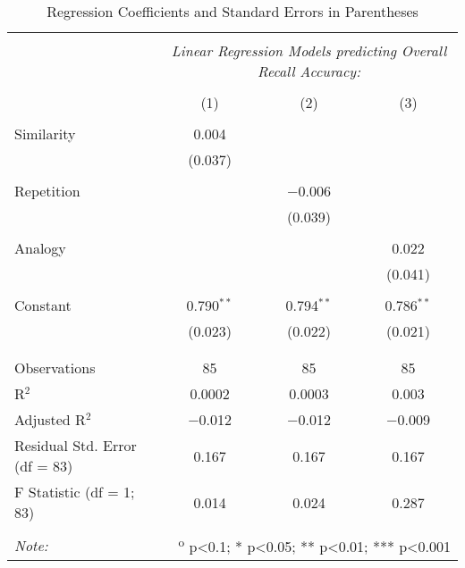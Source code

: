 
\begin{table}[!htbp] \centering
  \caption{Regression Coefficients and Standard Errors in Parentheses}
  \label{table:fol}
  \small
  \renewcommand{\arraystretch}{0.6}
\begin{tabular}{@{\extracolsep{5pt}}lccc}
\\[-1.8ex]\hline
\hline \\[-1.8ex]
 & \multicolumn{3}{c}{\textit{Linear Regression Models predicting Overall Recall Accuracy:}} \\
\cline{2-4}
\\[-1.8ex] & (1) & (2) & (3)\\
\hline \\[-1.8ex]
 Similarity & 0.004 &  &  \\
  & (0.037) &  &  \\
  & & & \\
 Repetition &  & $-$0.006 &  \\
  &  & (0.039) &  \\
  & & & \\
 Analogy &  &  & 0.022 \\
  &  &  & (0.041) \\
  & & & \\
 Constant & 0.790$^{**}$ & 0.794$^{**}$ & 0.786$^{**}$ \\
  & (0.023) & (0.022) & (0.021) \\
  & & & \\
\hline \\[-1.8ex]
Observations & 85 & 85 & 85 \\
R$^{2}$ & 0.0002 & 0.0003 & 0.003 \\
Adjusted R$^{2}$ & $-$0.012 & $-$0.012 & $-$0.009 \\
Residual Std. Error (df = 83) & 0.167 & 0.167 & 0.167 \\
F Statistic (df = 1; 83) & 0.014 & 0.024 & 0.287 \\
\hline
\hline \\[-1.8ex]
\textit{Note:}  & \multicolumn{3}{r}{\textsuperscript{o} p<0.1; * p<0.05; ** p<0.01; *** p<0.001} \\
\end{tabular}
\end{table}
